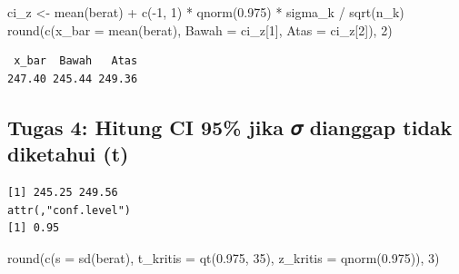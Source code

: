 \documentclass[
  indonesian,
  letterpaper,
]{book}
\newenvironment{Shaded}{\begin{snugshade}}{\end{snugshade}}
\newcommand{\AttributeTok}[1]{\textcolor[rgb]{0.40,0.45,0.13}{#1}}
\newcommand{\DecValTok}[1]{\textcolor[rgb]{0.68,0.00,0.00}{#1}}
\newcommand{\FloatTok}[1]{\textcolor[rgb]{0.68,0.00,0.00}{#1}}
\newcommand{\FunctionTok}[1]{\textcolor[rgb]{0.28,0.35,0.67}{#1}}
\newcommand{\NormalTok}[1]{\textcolor[rgb]{0.00,0.23,0.31}{#1}}
\newcommand{\OtherTok}[1]{\textcolor[rgb]{0.00,0.23,0.31}{#1}}
\newcommand{\SpecialCharTok}[1]{\textcolor[rgb]{0.37,0.37,0.37}{#1}}
\begin{document}
\begin{Shaded}
\begin{Highlighting}[]
\NormalTok{ci\_z }\OtherTok{\textless{}{-}} \FunctionTok{mean}\NormalTok{(berat) }\SpecialCharTok{+} \FunctionTok{c}\NormalTok{(}\SpecialCharTok{{-}}\DecValTok{1}\NormalTok{, }\DecValTok{1}\NormalTok{) }\SpecialCharTok{*} \FunctionTok{qnorm}\NormalTok{(}\FloatTok{0.975}\NormalTok{) }\SpecialCharTok{*}\NormalTok{ sigma\_k }\SpecialCharTok{/} \FunctionTok{sqrt}\NormalTok{(n\_k)}
\FunctionTok{round}\NormalTok{(}\FunctionTok{c}\NormalTok{(}\AttributeTok{x\_bar =} \FunctionTok{mean}\NormalTok{(berat), }\AttributeTok{Bawah =}\NormalTok{ ci\_z[}\DecValTok{1}\NormalTok{], }\AttributeTok{Atas =}\NormalTok{ ci\_z[}\DecValTok{2}\NormalTok{]), }\DecValTok{2}\NormalTok{)}
\end{Highlighting}
\end{Shaded}

\begin{verbatim}
 x_bar  Bawah   Atas 
247.40 245.44 249.36 
\end{verbatim}

\subsection{Tugas 4: Hitung CI 95\% jika 𝜎 dianggap tidak diketahui
(t)}\label{tugas-4-hitung-ci-95-jika-ux1d70e-dianggap-tidak-diketahui-t}

\begin{Shaded}
\end{Shaded}

\begin{verbatim}
[1] 245.25 249.56
attr(,"conf.level")
[1] 0.95
\end{verbatim}

\begin{Shaded}
\begin{Highlighting}[]
\FunctionTok{round}\NormalTok{(}\FunctionTok{c}\NormalTok{(}\AttributeTok{s =} \FunctionTok{sd}\NormalTok{(berat), }\AttributeTok{t\_kritis =} \FunctionTok{qt}\NormalTok{(}\FloatTok{0.975}\NormalTok{, }\DecValTok{35}\NormalTok{), }\AttributeTok{z\_kritis =} \FunctionTok{qnorm}\NormalTok{(}\FloatTok{0.975}\NormalTok{)), }\DecValTok{3}\NormalTok{)}
\end{Highlighting}
\end{Shaded}
\end{document}

